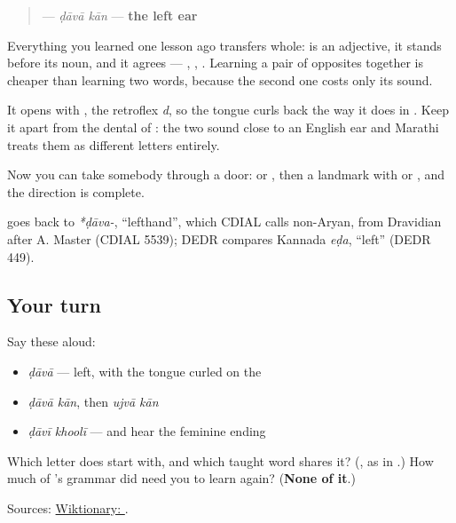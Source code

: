 \begin{quote}
\textbf{ } — \emph{ḍāvā kān} — \textbf{the left ear}
\end{quote}

Everything you learned one lesson ago transfers whole: \textbf{} is an adjective, it stands before its noun, and it agrees — \textbf{}, \textbf{}, \textbf{}. Learning a pair of opposites together is cheaper than learning two words, because the second one costs only its sound.

It opens with \textbf{}, the retroflex \emph{d}, so the tongue curls back the way it does in \textbf{}. Keep it apart from the dental \textbf{} of \textbf{}: the two sound close to an English ear and Marathi treats them as different letters entirely.

Now you can take somebody through a door: \textbf{} or \textbf{}, then a landmark with \textbf{} or \textbf{}, and the direction is complete.

\begin{cousinweb}
\textbf{} goes back to \emph{*ḍāva-}, \textquotedblleft{}lefthand\textquotedblright{}, which CDIAL calls non-Aryan, from Dravidian after A. Master (CDIAL 5539); DEDR compares Kannada \emph{eḍa}, \textquotedblleft{}left\textquotedblright{} (DEDR 449).
\end{cousinweb}

\subsection*{Your turn}
Say these aloud:

\begin{itemize}
\raggedright
  \item \emph{ḍāvā} — left, with the tongue curled on the \textbf{}
  \item \emph{ḍāvā kān}, then \emph{ujvā kān}
  \item \emph{ḍāvī khoolī} — and hear the feminine ending
\end{itemize}

\begin{tcolorbox}[breakable,colback=teal!4,colframe=teal!35!black,title={Before you move on}]
Which letter does \textbf{} start with, and which taught word shares it? (\textbf{}, as in \textbf{}.) How much of \textbf{}'s grammar did \textbf{} need you to learn again? (\textbf{None of it}.)

Sources: \href{https://en.wiktionary.org/wiki/\%E0\%A4\%A1\%E0\%A4\%BE\%E0\%A4\%B5\%E0\%A4\%BE}{Wiktionary: }.
\end{tcolorbox}
